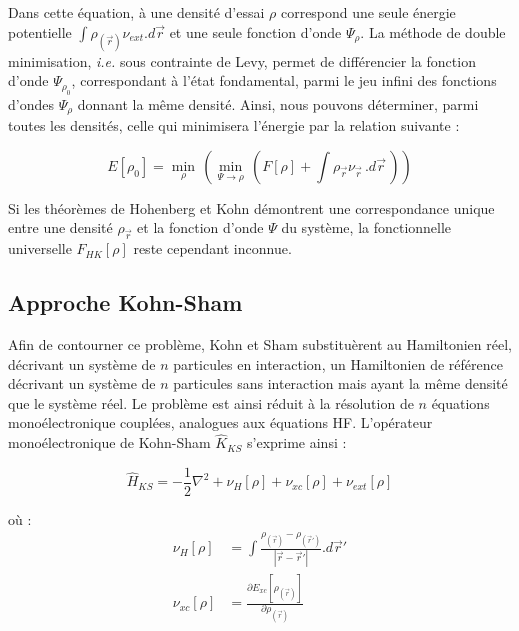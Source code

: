 	Dans cette équation, à une densité d'essai $\rho$ correspond une seule énergie potentielle $\int \rho_{(\vec{r})} \nu_{ext} .d\vec{r}$ et une seule fonction d'onde $\Psi_{\rho}$. La méthode de double minimisation, \textit{i.e.} sous contrainte de Levy, permet de différencier la fonction d'onde $\Psi_{\rho_{0}}$, correspondant à l'état fondamental, parmi le jeu infini des fonctions d'ondes $\Psi_{\rho}$ donnant la même densité. Ainsi, nous pouvons déterminer, parmi toutes les densités, celle qui minimisera l'énergie par la relation suivante :
	
	\begin{equation}
	E[\rho_{0}] = \min\limits_{\rho}\, (\min\limits_{\Psi\rightarrow\rho}\, (F[\rho] + \int \rho_{\vec{r}} \nu_{\vec{r}}\, .d\vec{r}\, ))
	\end{equation}
	
	Si les théorèmes de Hohenberg et Kohn démontrent une correspondance unique entre une densité $\rho_{\vec{r}}$ et la fonction d'onde $\Psi$ du système, la fonctionnelle universelle $F_{HK}[\rho]$ reste cependant inconnue.
	
	\subsection{Approche Kohn-Sham}\label{Kohn-Sham}
	
	Afin de contourner ce problème, Kohn et Sham substituèrent au Hamiltonien réel, décrivant un système de $n$ particules en interaction, un Hamiltonien de référence décrivant un système de $n$ particules sans interaction mais ayant la même densité que le système réel. Le problème est ainsi réduit à la résolution de $n$ équations monoélectronique couplées, analogues aux équations HF. L'opérateur monoélectronique de Kohn-Sham $\hat{K}_{KS}$ s'exprime ainsi :
	
	\begin{equation}
	\hat{H}_{KS} = -\frac{1}{2} \nabla^{2} + \nu_{H}[\rho] + \nu_{xc}[\rho] + \nu_{ext}[\rho]
	\end{equation}
	
	\noindent où :
	\begin{align}
	\nu_{H}[\rho] &= \int \frac{\rho_{(\vec{r})} - \rho_{(\vec{r}')}}{|\vec{r} - \vec{r}'|} .d\vec{r}' \\
	\nu_{xc}[\rho] &= \frac{\partial E_{xc}[\rho_{(\vec{r})}]}{\partial\rho_{(\vec{r})}}
	\end{align}
	
